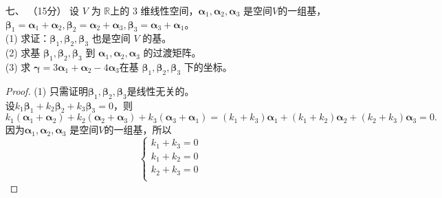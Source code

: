 \begin{enumerate}[1~]
\item[七、]（15分）
设 $V$ 为 $\mathbb{R}$上的 $3$ 维线性空间，$\boldsymbol { \boldsymbol{\alpha} }_1, \boldsymbol { \boldsymbol{\alpha} }_2, \boldsymbol { \boldsymbol{\alpha} }_3$ 是空间$ V $的一组基，$\boldsymbol { \boldsymbol{\beta} }_1 =\boldsymbol { \boldsymbol{\alpha} }_1 +\boldsymbol { \boldsymbol{\alpha} }_2, \boldsymbol { \boldsymbol{\beta} }_2 = \boldsymbol { \boldsymbol{\alpha} }_2 +\boldsymbol { \boldsymbol{\alpha} }_3, \boldsymbol { \boldsymbol{\beta} }_3 =\boldsymbol { \boldsymbol{\alpha} }_3 + \boldsymbol { \boldsymbol{\alpha} }_1$。\\
(1) 求证：$\boldsymbol { \boldsymbol{\beta} }_1, \boldsymbol { \boldsymbol{\beta} }_2, \boldsymbol { \boldsymbol{\beta} }_3$ 也是空间 $V$ 的基。\\
(2) 求基 $\boldsymbol { \boldsymbol{\beta} }_1, \boldsymbol { \boldsymbol{\beta} }_2, \boldsymbol { \boldsymbol{\beta} }_3$ 到 $\boldsymbol { \boldsymbol{\alpha} }_1, \boldsymbol { \boldsymbol{\alpha} }_2, \boldsymbol { \boldsymbol{\alpha} }_3$ 的过渡矩阵。\\
(3) 求 $\boldsymbol{\boldsymbol{\gamma}} = 3\boldsymbol { \boldsymbol{\alpha} }_1 + \boldsymbol { \boldsymbol{\alpha} }_2 - 4\boldsymbol { \boldsymbol{\alpha} }_3 $在基 $\boldsymbol { \boldsymbol{\beta} }_1, \boldsymbol { \boldsymbol{\beta} }_2, \boldsymbol { \boldsymbol{\beta} }_3$ 下的坐标。
\begin{proof}
(1) 只需证明$\boldsymbol { \boldsymbol{\beta} }_1, \boldsymbol { \boldsymbol{\beta} }_2, \boldsymbol { \boldsymbol{\beta} }_3$是线性无关的。\\
设$k_1\boldsymbol { \boldsymbol{\beta} }_1+k_2\boldsymbol { \boldsymbol{\beta} }_2+k_3\boldsymbol { \boldsymbol{\beta} }_3=0$，则\[
k_1(\boldsymbol { \boldsymbol{\alpha} }_1+\boldsymbol { \boldsymbol{\alpha} }_2)+k_2(\boldsymbol { \boldsymbol{\alpha} }_2+\boldsymbol { \boldsymbol{\alpha} }_3)+k_3(\boldsymbol { \boldsymbol{\alpha} }_3+\boldsymbol { \boldsymbol{\alpha} }_1)=(k_1+k_3)\boldsymbol { \boldsymbol{\alpha} }_1 + (k_1+k_2)\boldsymbol { \boldsymbol{\alpha} }_2 + (k_2+k_3)\boldsymbol { \boldsymbol{\alpha} }_3=0.
\]
因为$\boldsymbol { \boldsymbol{\alpha} }_1, \boldsymbol { \boldsymbol{\alpha} }_2, \boldsymbol { \boldsymbol{\alpha} }_3$ 是空间$ V $的一组基，所以\[
\left\{ \begin{array}{l}
	k_1+k_3=0\\
	k_1+k_2=0\\
	k_2+k_3=0\\
\end{array} \right. 
\]
\end{proof}
\end{enumerate}
